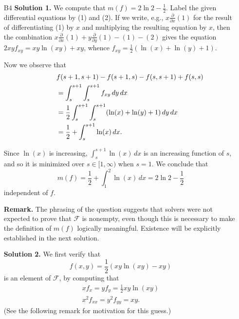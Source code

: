 \documentclass[amssymb,twocolumn,pra,10pt,aps]{revtex4-1}
\begin{document}
\begin{itemize}
\noindent
\textbf{Remark.}
(by Steven Klee)
A related argument is to compute $\det(PQ-I)$ using the \emph{matrix determinant lemma}:
if $A$ is an invertible $n \times n$ matrix and $v, w$ are $1 \times n$ column vectors, then
\[
\det(A + vw^T) = \det(A) (1 + w^T A^{-1} v).
\]
This reduces to the case $A = I$, in which case it again comes down to the fact that the product of two square matrices (in this case, obtained from $v$ and $w$ by padding with zeroes) retains the same characteristic polynomial when the factors are reversed.

\item[B4]
\noindent
\textbf{Solution 1.}
We compute that $m(f) = 2 \ln 2 - \frac{1}{2}$.
Label the given differential equations by (1) and (2). If we write, e.g., $x\frac{\partial}{\partial x}(1)$ for the result of differentiating (1) by $x$ and multiplying the resulting equation by $x$, then the combination
$x\frac{\partial}{\partial x}(1)+y\frac{\partial}{\partial y}(1)-(1)-(2)$ gives the equation
$2xyf_{xy} = xy\ln(xy)+xy$, whence $f_{xy} = \frac{1}{2} (\ln(x)+\ln(y)+1)$.

Now we observe that
\begin{align*}
\lefteqn{f(s+1,s+1)-f(s+1,s)-f(s,s+1)+f(s,s)} \\
 &= \int_s^{s+1} \int_s^{s+1} f_{xy}\,dy\,dx \\
&= \frac{1}{2} \int_s^{s+1} \int_s^{s+1} (\ln(x)+\ln(y)+1)\,dy\,dx \\
&= \frac{1}{2} + \int_s^{s+1} \ln(x)\,dx.
\end{align*}

Since $\ln(x)$ is increasing, $\int_s^{s+1} \ln(x)\,dx$ is an increasing function of $s$, and so it is minimized over $s \in [1,\infty)$ when $s=1$. We conclude that
\[
m(f) = \frac{1}{2} + \int_1^2 \ln(x)\,dx = 2 \ln 2-\frac{1}{2}
\]
independent of $f$.

\noindent
\textbf{Remark.}
The phrasing of the question suggests that solvers were not expected to prove that $\mathcal{F}$ is nonempty,
even though this is necessary to make the definition of $m(f)$ logically meaningful. Existence will be explicitly established in the next solution.

\noindent
\textbf{Solution 2.}
We first verify that 
\[
f(x,y) = \frac{1}{2}(xy\ln(xy)-xy)
\]
is an element of $\mathcal{F}$, by computing that
\begin{gather*}
xf_x = yf_y = \frac{1}{2} xy \ln(xy) \\
x^2 f_{xx} = y^2 f_{yy} = xy.
\end{gather*}
(See the following remark for motivation for this guess.)


\end{itemize}
\end{document}
